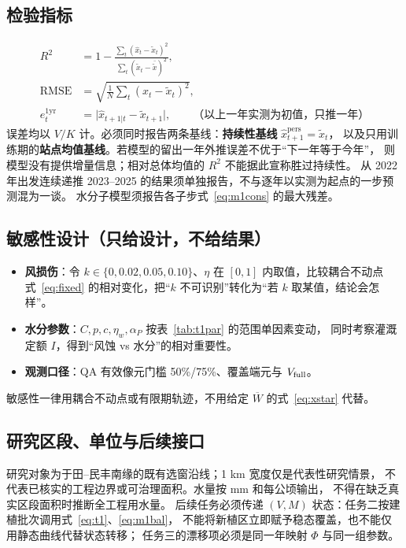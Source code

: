 \documentclass[11pt,a4paper]{ctexart}
\begin{document}
\subsection{检验指标}

\begin{align}
R^2&=1-\frac{\sum_t(\hat x_t-\tilde x_t)^2}{\sum_t(\tilde x_t-\bar{\tilde x})^2},\label{eq:r2}\\
\mathrm{RMSE}&=\sqrt{\tfrac{1}{N}\sum_t(\hat x_t-\tilde x_t)^2},\label{eq:rmse}\\
e^{\mathrm{1yr}}_t&=\big|\hat x_{t+1|t}-\tilde x_{t+1}\big|,\qquad
\text{（以上一年实测为初值，只推一年）}\label{eq:oneyr}
\end{align}
误差均以 $V/K$ 计。必须同时报告两条基线：\textbf{持续性基线} $\hat x^{\mathrm{pers}}_{t+1}=\tilde x_t$，
以及只用训练期的\textbf{站点均值基线}。若模型的留出一年外推误差不优于“下一年等于今年”，
则模型没有提供增量信息；相对总体均值的 $R^2$ 不能据此宣称胜过持续性。
从 2022 年出发连续递推 2023--2025 的结果须单独报告，不与逐年以实测为起点的一步预测混为一谈。
水分子模型须报告各子步式~\eqref{eq:m1cons} 的最大残差。

\subsection{敏感性设计（只给设计，不给结果）}

\begin{itemize}
\item \textbf{风损伤}：令 $k\in\{0,0.02,0.05,0.10\}$、$\eta$ 在 $[0,1]$ 内取值，比较耦合不动点式~\eqref{eq:fixed}
的相对变化，把“$k$ 不可识别”转化为“若 $k$ 取某值，结论会怎样”。
\item \textbf{水分参数}：$C,p,c,\eta_w,\alpha_P$ 按表~\ref{tab:t1par} 的范围单因素变动，
同时考察灌溉定额 $I$，得到“风蚀 vs 水分”的相对重要性。
\item \textbf{观测口径}：QA 有效像元门槛 50\%/75\%、覆盖端元与 $V_{\rm full}$。
\end{itemize}
敏感性一律用耦合不动点或有限期轨迹，不用给定 $\overline W$ 的式~\eqref{eq:xstar} 代替。

\subsection{研究区段、单位与后续接口}

研究对象为于田--民丰南缘的既有选窗沿线；1 km 宽度仅是代表性研究情景，
不代表已核实的工程边界或可治理面积。水量按 mm 和每公顷输出，
不得在缺乏真实区段面积时推断全工程用水量。
后续任务必须传递 $(V,M)$ 状态：任务二按建植批次调用式~\eqref{eq:t1}、\eqref{eq:m1bal}，
不能将新植区立即赋予稳态覆盖，也不能仅用静态曲线代替状态转移；
任务三的漂移项必须是同一年映射 $\Phi$ 与同一组参数。
\end{document}
